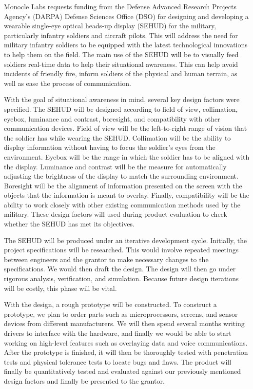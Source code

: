Monocle Labs requests funding from the Defense Advanced Research Projects
Agency's (DARPA) Defense Sciences Office (DSO) for designing and developing a
wearable single-eye optical heads-up display (SEHUD) for the military,
particularly infantry soldiers and aircraft pilots. This will address the need
for military infantry soldiers to be equipped with the latest technological
innovations to help them on the field. The main use of the SEHUD will be to
visually feed soldiers real-time data to help their situational awareness. This
can help avoid incidents of friendly fire, inform soldiers of the physical and
human terrain, as well as ease the process of communication.

With the goal of situational awareness in mind, several key design
factors were specified. The SEHUD will be designed according to field
of view, collimation, eyebox, luminance and contrast, boresight, and
compatibility with other communication devices. Field of view will be
the left-to-right range of vision that the soldier has while wearing
the SEHUD. Collimation will be the ability to display information
without having to focus the soldier's eyes from the environment.
Eyebox will be the range in which the soldier has to be aligned with
the display. Luminance and contrast will be the measure for
automatically adjusting the brightness of the display to match the
surrounding environment. Boresight will be the alignment of
information presented on the screen with the objects that the
information is meant to overlay. Finally, compatibility will be the
ability to work closely with other existing communication methods used
by the military. These design factors will used during product
evaluation to check whether the SEHUD has met its objectives.

The SEHUD will be produced under an iterative development cycle.
Initially, the project specifications will be researched. This would
involve repeated meetings between engineers and the grantor to make
necessary changes to the specifications. We would then draft the
design. The design will then go under rigorous analysis, verification,
and simulation. Because future design iterations will be costly, this
phase will be vital.

With the design, a rough prototype will be constructed. To construct a
prototype, we plan to order parts such as microprocessors, screens,
and sensor devices from different manufacturers. We will then spend
several months writing drivers to interface with the hardware, and
finally we would be able to start working on high-level features such
as overlaying data and voice communications. After the prototype is
finished, it will then be thoroughly tested with penetration tests and
physical tolerance tests to locate bugs and flaws. The product will
finally be quantitatively tested and evaluated against our previously
mentioned design factors and finally be presented to the grantor.

